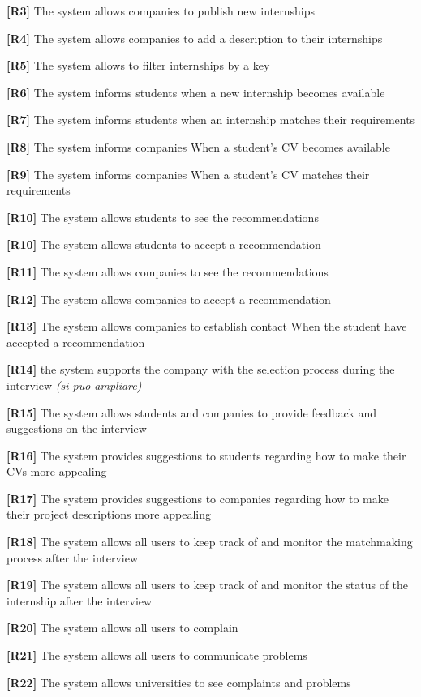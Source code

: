 \textbf{[R3]} The system allows companies to publish new internships

\textbf{[R4]} The system allows companies to add a description to their internships

\textbf{[R5]} The system allows to filter internships by a key

\textbf{[R6]} The system informs students when a new internship becomes available

\textbf{[R7]} The system informs students when an internship matches their requirements 

\textbf{[R8]} The system informs companies When a student's CV becomes available

\textbf{[R9]} The system informs companies When a student's CV matches  their requirements

\textbf{[R10]} The system allows students to see the recommendations

\textbf{[R10]} The system allows students to accept a recommendation

\textbf{[R11]} The system allows companies to see the recommendations

\textbf{[R12]} The system allows companies to accept a recommendation 

\textbf{[R13] } The system allows companies to establish contact When the student have accepted a recommendation

\textbf{[R14]} the system supports the company with the selection process during the interview \textit{(si puo ampliare)}

\textbf{[R15]} The system allows students and companies to provide feedback and suggestions on the interview

\textbf{[R16] }The system provides suggestions to students regarding how to make their CVs more appealing

\textbf{[R17]} The system provides suggestions to companies regarding how to make their project descriptions more appealing

\textbf{[R18]} The system allows all users to keep track of and monitor the matchmaking process after the interview

\textbf{[R19]} The system allows all users to keep track of and monitor the status of the internship after the interview

\textbf{[R20]} The system allows all users to complain 

\textbf{[R21]} The system allows all users to communicate problems

\textbf{[R22]} The system allows universities to see complaints and problems

